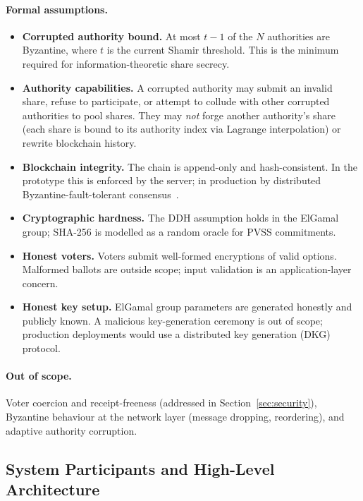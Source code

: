 \documentclass[12pt,a4paper]{article}
\theoremstyle{definition}
\theoremstyle{remark}
\begin{document}
\paragraph{Formal assumptions.}
\begin{itemize}
  \item \textbf{Corrupted authority bound.} At most $t-1$ of the $N$
    authorities are Byzantine, where $t$ is the current Shamir threshold.
    This is the minimum required for information-theoretic share secrecy.
  \item \textbf{Authority capabilities.} A corrupted authority may submit
    an invalid share, refuse to participate, or attempt to collude with
    other corrupted authorities to pool shares.
    They may \emph{not} forge another authority's share (each share is
    bound to its authority index via Lagrange interpolation) or rewrite
    blockchain history.
  \item \textbf{Blockchain integrity.} The chain is append-only and
    hash-consistent. In the prototype this is enforced by the server;
    in production by distributed Byzantine-fault-tolerant
    consensus~\cite{lamport1982}.
  \item \textbf{Cryptographic hardness.} The DDH assumption holds in the
    ElGamal group; SHA-256 is modelled as a random oracle for PVSS
    commitments.
  \item \textbf{Honest voters.} Voters submit well-formed encryptions of
    valid options. Malformed ballots are outside scope; input validation
    is an application-layer concern.
  \item \textbf{Honest key setup.} ElGamal group parameters are generated
    honestly and publicly known. A malicious key-generation ceremony is
    out of scope; production deployments would use a distributed key
    generation (DKG) protocol.
\end{itemize}

\paragraph{Out of scope.}
Voter coercion and receipt-freeness (addressed in
Section~\ref{sec:security}), Byzantine behaviour at the network layer
(message dropping, reordering), and adaptive authority corruption.

\subsection{System Participants and High-Level Architecture}
\end{document}
